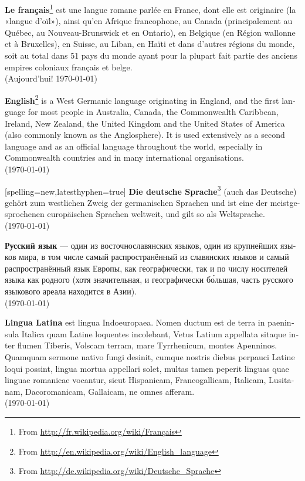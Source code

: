 \documentclass[a4paper]{article}
\begin{document}
\noindent
\textbf{Le français}\footnote{ From \url{http://fr.wikipedia.org/wiki/Français}} est une langue romane parlée en France, dont elle est originaire (la «langue d'oïl»), ainsi qu'en Afrique francophone, au Canada (principalement au Québec, au Nouveau-Brunswick et en Ontario), en Belgique (en Région wallonne et à Bruxelles), en Suisse, au Liban, en Haïti et dans d'autres régions du monde, soit au total dans 51 pays du monde ayant pour la plupart fait partie des anciens empires coloniaux français et belge. \\
(Aujourd'hui! \today)

\begin{english}
\textbf{English}\footnote{From \url{http://en.wikipedia.org/wiki/English_language}} is a West Germanic language originating in England, and the first language for most people in Australia, Canada, the Commonwealth Caribbean, Ireland, New Zealand, the United Kingdom and the United States of America (also commonly known as the Anglosphere). It is used extensively as a second language and as an official language throughout the world, especially in Commonwealth countries and in many international organisations. \\
(\today)
\end{english}

\begin{german}[spelling=new,latesthyphen=true]
\textbf{Die deutsche Sprache}\footnote{ From \url{http://de.wikipedia.org/wiki/Deutsche_Sprache}} (auch das Deutsche) gehört zum westlichen Zweig der germanischen Sprachen und ist eine der meistgesprochenen europäischen Sprachen weltweit, und gilt so als Weltsprache.\\
(\today)
\end{german}

\begin{russian}
\textbf{Русский язык} — один из восточнославянских языков, один из крупнейших языков мира, в том числе самый распространённый из славянских языков и самый распространённый язык Европы, как географически, так и по числу носителей языка как родного (хотя значительная, и географически бо́льшая, часть русского языкового ареала находится в Азии).	\\
(\today)
\end{russian}

\begin{latin}
\textbf{Lingua Latina} est lingua Indoeuropaea. Nomen ductum est de terra in paeninsula Italica quam Latine loquentes incolebant, Vetus Latium appellata sitaque inter flumen Tiberis, Volscam terram, mare Tyrrhenicum, montes Apenninos. 
Quamquam sermone nativo fungi desinit, cumque nostris diebus perpauci Latine loqui possint, lingua mortua appellari solet, multas tamen peperit linguas quae linguae romanicae vocantur, sicut Hispanicam, Francogallicam, Italicam, Lusitanam, Dacoromanicam, Gallaicam, ne omnes afferam. \\
(\today) 
\end{latin}
\end{document}

